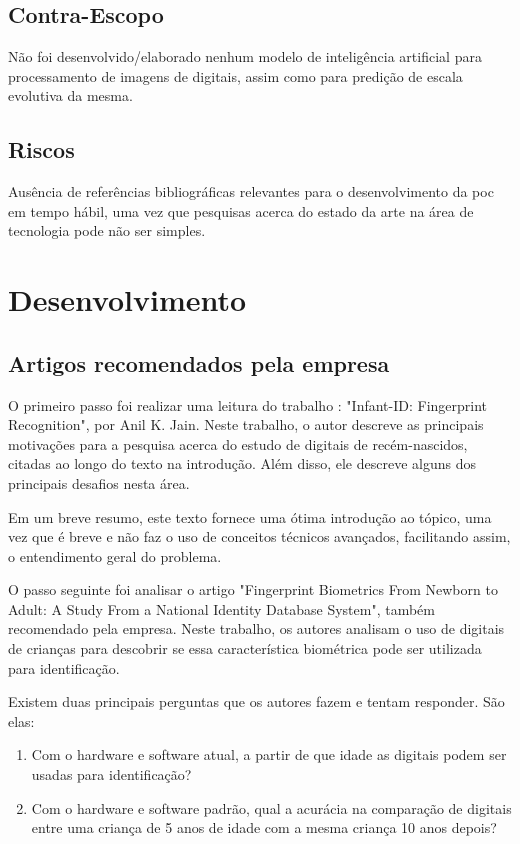 \documentclass[12pt,a4paper]{article}
\begin{document}
\subsection{Contra-Escopo}
Não foi desenvolvido/elaborado nenhum modelo de inteligência artificial para processamento de imagens de digitais, assim como para predição de escala evolutiva da mesma.
\subsection{Riscos}
Ausência de referências bibliográficas relevantes para o desenvolvimento da poc em tempo hábil, uma vez que pesquisas acerca do estado da arte na área de tecnologia pode não ser simples.

\section{Desenvolvimento}
\subsection{Artigos recomendados pela empresa}
O primeiro passo foi realizar uma leitura do trabalho \cite{JainPoster}: "Infant-ID: Fingerprint Recognition", por Anil K. Jain. Neste trabalho, o autor descreve as principais motivações para a pesquisa acerca do estudo de digitais de recém-nascidos, citadas ao longo do texto na introdução. Além disso, ele descreve alguns dos principais desafios nesta área.

Em um breve resumo, este texto fornece uma ótima introdução ao tópico, uma vez que é breve e não faz o uso de conceitos técnicos avançados, facilitando assim, o entendimento geral do problema.

O passo seguinte foi analisar o artigo \cite{Preciozzi} "Fingerprint Biometrics From Newborn to Adult: A
Study From a National Identity Database System", também recomendado pela empresa. Neste trabalho, os autores analisam o uso de digitais de crianças para descobrir se essa característica biométrica pode ser utilizada para identificação.

Existem duas principais perguntas que os autores fazem e tentam responder. São elas:

\begin{enumerate}
	\item Com o hardware e software atual, a partir de que idade as digitais podem ser usadas para identificação?
	
	\item Com o hardware e software padrão, qual a acurácia na comparação de digitais entre uma criança de 5 anos de idade com a mesma criança 10 anos depois?
\end{enumerate}
\end{document}
